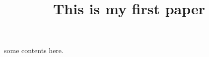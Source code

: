 \documentclass{article}
\title{This is my first paper}
\begin{document}
    some contents here.
\end{document}
